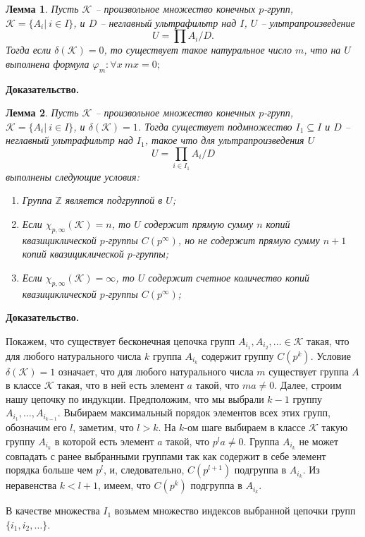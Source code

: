 \documentclass[a4paper,11pt,twoside]{article}
\newtheorem{lemma}{Лемма}[section]
\def\K{{\mathcal{K}}}
\def\Z{{\mathbb{Z}}}
\begin{document}
\begin{lemma}
Пусть $\K$ -- произвольное множество конечных $p$-групп, $\K = \{A_i | \ i \in I\}$, и $D$ -- неглавный ультрафильтр над $I$, $U$ -- ультрапроизведение 
$$U = \prod A_i \Big/ D.$$
Тогда если $\delta(\K) = 0$, то существует такое натуральное число $m$, что на $U$ выполнена формула $\varphi_m: \forall x \ mx = 0;$
\end{lemma}

{\bf Доказательство.}


\begin{lemma}
Пусть $\K$ -- произвольное множество конечных $p$-групп, $\K = \{A_i | \ i \in I\}$, и $\delta(\K) = 1$. Тогда существует подмножество $I_1 \subseteq I$ и $D$ -- неглавный ультрафильтр над $I_1$, такое что для ультрапроизведения $U$
$$U = \prod_{i \in I_1} A_i \Big/ D$$
выполнены следующие условия:
\begin{enumerate}
\item Группа $\Z$ является подгруппой в $U$;
\item Если $\chi_{p,\infty}(\K) = n$, то $U$ содержит прямую сумму $n$ копий квазициклической $p$-группы $C(p^\infty)$, но не содержит прямую сумму $n+1$ копий квазициклической $p$-группы;
\item Если $\chi_{p,\infty}(\K) = \infty$, то $U$ содержит счетное количество копий квазициклической $p$-группы $C(p^\infty)$;
\end{enumerate}
\end{lemma}

{\bf Доказательство.}

Покажем, что существует бесконечная цепочка групп $A_{i_1}, A_{i_2}, \ldots \in \K$ такая, что для любого натурального числа $k$ группа $A_{i_k}$ содержит группу $C(p^k)$. Условие $\delta(\K) = 1$ означает, что для любого натурального числа $m$ существует группа $A$ в классе $\K$ такая, что в ней есть элемент $a$ такой, что $ma \neq 0$. Далее, строим нашу цепочку по индукции. Предположим, что мы выбрали $k-1$ группу $A_{i_1}, \ldots, A_{i_{k-1}}$. Выбираем максимальный порядок элементов всех этих групп, обозначим его $l$, заметим, что $l > k$. На $k$-ом шаге выбираем в классе $\K$ такую группу $A_{i_k}$ в которой есть элемент $a$ такой, что $p^{l} a \neq 0$. Группа $A_{i_k}$ не может совпадать с ранее выбранными группами так как содержит в себе элемент порядка больше чем $p^l$, и, следовательно, $C(p^{l+1})$ подгруппа в $A_{i_k}$. Из неравенства $k < l+1$, имеем, что $C(p^k)$ подгруппа в $A_{i_k}$.

В качестве множества $I_1$ возьмем множество индексов выбранной цепочки групп $\{i_1, i_2, \ldots\}$.
\end{document}
